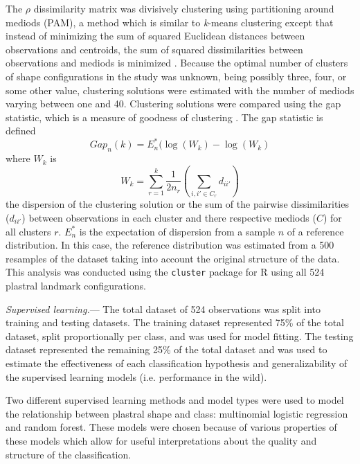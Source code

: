 \documentclass[12pt,letterpaper]{article}\usepackage{graphicx, color}
\renewcommand{\subsubsection}[1]{%
\vspace{2ex}
\noindent
\textit{#1.}---}
\begin{document}
The \(\rho\) dissimilarity matrix was divisively clustering using partitioning around mediods (PAM), a method which is similar to \textit{k}-means clustering except that instead of minimizing the sum of squared Euclidean distances between observations and centroids, the sum of squared dissimilarities between observations and mediods is minimized \citep{Kaufman1990}.
Because the optimal number of clusters of shape configurations in the study was unknown, being possibly three, four, or some other value, clustering solutions were estimated with the number of mediods varying between one and 40. Clustering solutions were compared using the gap statistic, which is a measure of goodness of clustering \citep{Tibshirani2001a}. The gap statistic is defined
\[Gap_{n}(k) = E^{*}_{n}(\log(W_{k}) - \log(W_{k})\] 
where \(W_{k}\) is
\[W_{k} = \sum^{k}_{r = 1}{\frac{1}{2n_{r}} (\sum_{i,i' \in C_{r}} d_{ii'})}\]
the dispersion of the clustering solution or the sum of the pairwise dissimilarities (\(d_{ii'}\)) between observations in each cluster and there respective mediods (\(C\)) for all clusters \(r\). \(E^{*}_{n}\) is the expectation of dispersion from a sample \(n\) of a reference distribution. In this case, the reference distribution was estimated from a 500 resamples of the dataset taking into account the original structure of the data.
This analysis was conducted using the \texttt{cluster} package for R \citep{Maechler2013} using all 524 plastral landmark configurations.

\subsubsection{Supervised learning}
The total dataset of 524 observations was split into training and testing datasets. The training dataset represented 75\% of the total dataset, split proportionally per class, and was used for model fitting. The testing dataset represented the remaining 25\% of the total dataset and  was used to estimate the effectiveness of each classification hypothesis and generalizability of the supervised learning models (i.e. performance in the wild).

Two different supervised learning methods and model types were used to model the relationship between plastral shape and class: multinomial logistic regression and random forest. These models were chosen because of various properties of these models which allow for useful interpretations about the quality and structure of the classification.
\end{document}
